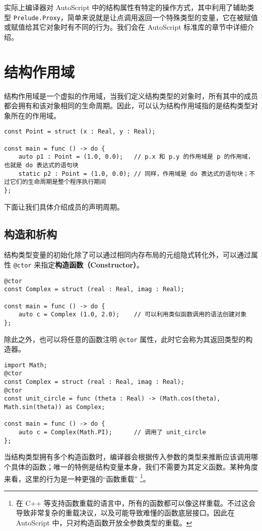 实际上编译器对 AutoScript 中的结构属性有特定的操作方式，其中利用了辅助类型 \lstinline!Prelude.Proxy!，简单来说就是让点调用返回一个特殊类型的变量，它在被赋值或赋值给其它对象时有不同的行为。我们会在 AutoScript 标准库的章节中详细介绍。


\section{结构作用域}

结构作用域是一个虚拟的作用域，当我们定义结构类型的对象时，所有其中的成员都会拥有和该对象相同的生命周期。因此，可以认为结构作用域指的是结构类型对象所在的作用域。

\begin{lstlisting}
const Point = struct (x : Real, y : Real);

const main = func () -> do {
	auto p1 : Point = (1.0, 0.0);	// p.x 和 p.y 的作用域是 p 的作用域，也就是 do 表达式的语句块
	static p2 : Point = (1.0, 0.0);	// 同样，作用域是 do 表达式的语句块；不过它们的生命周期是整个程序执行期间
};
\end{lstlisting}

下面让我们具体介绍成员的声明周期。

\subsection{构造和析构}

结构类型变量的初始化除了可以通过相同内存布局的元组隐式转化外，可以通过属性 \lstinline!@ctor! 来指定\textbf{构造函数（Constructor）}。

\begin{lstlisting}
@ctor
const Complex = struct (real : Real, imag : Real);

const main = func () -> do {
	auto c = Complex (1.0, 2.0);	// 可以利用类似函数调用的语法创建对象
};
\end{lstlisting}

除此之外，也可以将任意的函数注明 \lstinline!@ctor! 属性，此时它会称为其返回类型的构造器。

\begin{lstlisting}
import Math;
@ctor
const Complex = struct (real : Real, imag : Real);
@ctor
const unit_circle = func (theta : Real) -> (Math.cos(theta), Math.sin(theta)) as Complex;

const main = func () -> do {
	auto c = Complex(Math.PI);		// 调用了 unit_circle
};
\end{lstlisting}

当结构类型拥有多个构造函数时，编译器会根据传入参数的类型来推断应该调用哪个具体的函数；唯一的特例是结构变量本身，我们不需要为其定义函数。某种角度来看，这里的行为是一种更强的“函数重载” \footnote{在 C++ 等支持函数重载的语言中，所有的函数都可以像这样重载。不过这会导致非常复杂的重载决议，以及可能导致难懂的函数底层接口。因此在 AutoScript 中，只对构造函数开放全参数类型的重载。}。 \\

